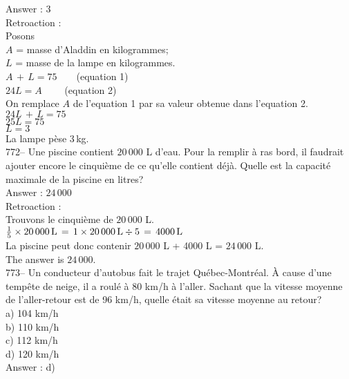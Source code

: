 ﻿\documentclass[letterpaper, 12pt]{article}
\begin{document}
Answer : 3\\

Retroaction :\\
Posons\\
$A$ = masse d'Aladdin en kilogrammes; \\
$L$ = masse de la lampe en kilogrammes.\\

$A\,+\,L=75 \qquad $(equation 1)\\
$24L=A \qquad $ (equation 2)\\

On remplace $A$ de l'equation 1 par sa valeur obtenue dans l'equation
2.\\
$24L \,+\,L = 75$\\
$25L=75$\\
$L=3$\\
La lampe p\`ese 3\,kg.\\

772-- Une piscine contient $20\,000$ L d'eau.  Pour la remplir \`a ras bord,
il faudrait ajouter encore le cinqui\`eme de ce qu'elle contient d\'ej\`a.
Quelle est la capacit\'e maximale de la piscine en litres?\\

Answer : $24\,000$ \\

Retroaction : \\
Trouvons le cinqui\`eme de $20\,000$ L.\\
$\frac{1}{5}\times 20\,000
\textrm{\,L}\,=\,1\times20\,000\,\textrm{L}\div5\,=\,4000\,\textrm{L}$\\
La piscine peut donc contenir $20\,000$ L + 4000 L = $24\,000$ L.\\
The answer is $24\,000$.\\

773-- Un conducteur d'autobus fait le trajet Qu\'ebec-Montr\'eal.  \`A cause
d'une temp\^ete de neige, il a roul\'e \`a 80 km/h \`a l'aller.  Sachant que
la vitesse moyenne de l'aller-retour est de 96 km/h, quelle \'etait sa
vitesse moyenne au retour?\\
a) 104 km/h\\
b) 110 km/h\\
c) 112 km/h\\
d) 120 km/h\\

Answer : d)\\
\end{document}
